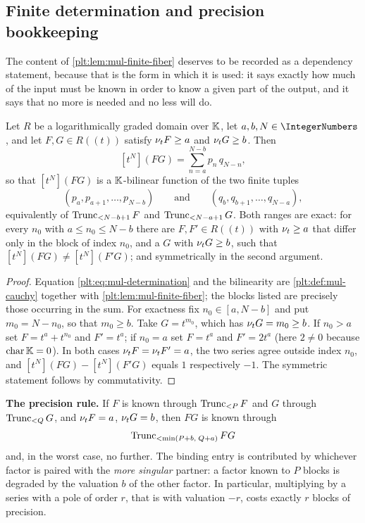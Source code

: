 \subsection{Finite determination and precision bookkeeping}
\label{plt:sec:mul-finite-det}

The content of \cref{plt:lem:mul-finite-fiber} deserves to be recorded as a
dependency statement, because that is the form in which it is used: it says
exactly how much of the input must be known in order to know a given part of
the output, and it says that no more is needed and no less will do.

\begin{theorem}
\label{plt:thm:mul-finite-determination}
Let $R$ be a logarithmically graded domain over $\K$, let $a,b,N\in
\IntegerNumbers$, and let $F,G\in R((t))$ satisfy $\ordt F\ge a$ and
$\ordt G\ge b$.  Then
\begin{equation}\label{plt:eq:mul-determination}
 [t^N](FG)=\sum_{n=a}^{N-b}p_n\,q_{N-n},
\end{equation}
so that $[t^N](FG)$ is a $\K$-bilinear function of the two finite tuples
\[
 (p_a,p_{a+1},\ldots,p_{N-b})
 \qquad\text{and}\qquad
 (q_b,q_{b+1},\ldots,q_{N-a}),
\]
equivalently of $\Trunc{F}{N-b+1}$ and $\Trunc{G}{N-a+1}$.  Both ranges are
exact: for every $n_0$ with $a\le n_0\le N-b$ there are $F,F'\in R((t))$ with
$\ordt\ge a$ that differ only in the block of index $n_0$, and a $G$ with
$\ordt G\ge b$, such that $[t^N](FG)\ne[t^N](F'G)$; and symmetrically in the
second argument.
\end{theorem}

\begin{proof}
Equation \eqref{plt:eq:mul-determination} and the bilinearity are
\cref{plt:def:mul-cauchy} together with \cref{plt:lem:mul-finite-fiber}; the
blocks listed are precisely those occurring in the sum.  For exactness fix
$n_0\in[a,N-b]$ and put $m_0=N-n_0$, so that $m_0\ge b$.  Take
$G=t^{m_0}$, which has $\ordt G=m_0\ge b$.  If $n_0>a$ set $F=t^a+t^{n_0}$
and $F'=t^a$; if $n_0=a$ set $F=t^a$ and $F'=2t^a$ (here $2\ne0$ because
$\operatorname{char}\K=0$).  In both cases $\ordt F=\ordt F'=a$, the two
series agree outside index $n_0$, and $[t^N](FG)-[t^N](F'G)$ equals $1$
respectively $-1$.  The symmetric statement follows by commutativity.
\end{proof}

\begin{checkpointbox}
\textbf{The precision rule.}  If $F$ is known through $\Trunc{F}{P}$ and $G$
through $\Trunc{G}{Q}$, and $\ordt F=a$, $\ordt G=b$, then $FG$ is known
through
\[
 \Trunc{FG}{\min(P+b,\;Q+a)}
\]
and, in the worst case, no further.  The binding entry is contributed by
whichever factor is paired with the \emph{more singular} partner: a factor
known to $P$ blocks is degraded by the valuation $b$ of the other factor.  In
particular, multiplying by a series with a pole of order $r$, that is with
valuation $-r$, costs exactly $r$ blocks of precision.
\end{checkpointbox}

